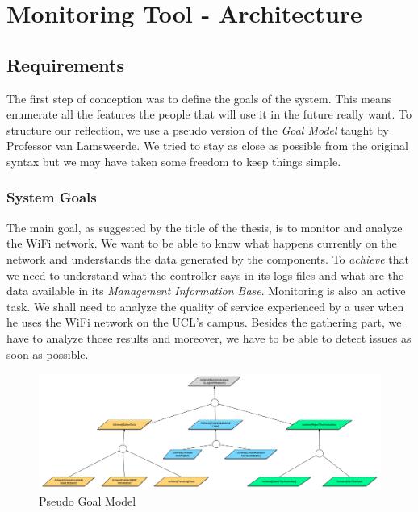 
\chapter{Monitoring Tool - Architecture} %

\label{Chapter3} %

\section{Requirements}
The first step of conception was to define the goals of the system. This means enumerate all the features the people that will use it in the future really want. To structure our reflection, we use a pseudo version of the \emph{Goal Model} taught by Professor van Lamsweerde\cite{van2009requirements}. We tried to stay as close as possible from the original syntax but we may have taken some freedom to keep things simple.
\subsection{System Goals}
The main goal, as suggested by the title of the thesis, is to monitor and analyze the WiFi network. We want to be able to know what happens currently on the network and understands the data generated by the components. To \emph{achieve} that we need to understand what the controller says in its logs files and what are the data available in its \emph{Management Information Base}. Monitoring is also an active task. We shall need to analyze the quality of service experienced by a user when he uses the WiFi network on the UCL's campus. Besides the gathering part, we have to analyze those results and moreover, we have to be able to detect issues as soon as possible.
\noindent
\begin{figure}[H]
\centering
	\includegraphics[width=1.1\linewidth]{Pictures/chapter3/goals.jpg}
	\caption{Pseudo Goal Model}
\end{figure}

